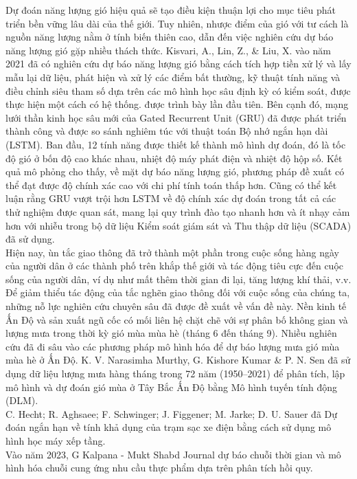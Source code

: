 \documentclass[conference]{IEEEtran}
\begin{document}
Dự đoán năng lượng gió hiệu quả sẽ tạo điều kiện thuận lợi cho mục tiêu phát triển bền vững lâu dài của thế giới. Tuy nhiên, nhược điểm của gió với tư cách là nguồn năng lượng nằm ở tính biến thiên cao, dẫn đến việc nghiên cứu dự báo năng lượng gió gặp nhiều thách thức. Kisvari, A., Lin, Z., & Liu, X. vào năm 2021 đã có nghiên cứu \cite{b4} dự báo năng lượng gió bằng cách tích hợp tiền xử lý và lấy mẫu lại dữ liệu, phát hiện và xử lý các điểm bất thường, kỹ thuật tính năng và điều chỉnh siêu tham số dựa trên các mô hình học sâu định kỳ có kiểm soát, được thực hiện một cách có hệ thống. được trình bày lần đầu tiên. Bên cạnh đó, mạng lưới thần kinh học sâu mới của Gated Recurrent Unit (GRU) đã được phát triển thành công và được so sánh nghiêm túc với thuật toán Bộ nhớ ngắn hạn dài (LSTM). Ban đầu, 12 tính năng được thiết kế thành mô hình dự đoán, đó là tốc độ gió ở bốn độ cao khác nhau, nhiệt độ máy phát điện và nhiệt độ hộp số. Kết quả mô phỏng cho thấy, về mặt dự báo năng lượng gió, phương pháp đề xuất có thể đạt được độ chính xác cao với chi phí tính toán thấp hơn. Cũng có thể kết luận rằng GRU vượt trội hơn LSTM về độ chính xác dự đoán trong tất cả các thử nghiệm được quan sát, mang lại quy trình đào tạo nhanh hơn và ít nhạy cảm hơn với nhiễu trong bộ dữ liệu Kiểm soát giám sát và Thu thập dữ liệu (SCADA) đã sử dụng.\\
Hiện nay, ùn tắc giao thông đã trở thành một phần trong cuộc sống hàng ngày của người dân ở các thành phố trên khắp thế giới và tác động tiêu cực đến cuộc sống của người dân, ví dụ như mất thêm thời gian đi lại, tăng lượng khí thải, v.v. Để giảm thiểu tác động của tắc nghẽn giao thông đối với cuộc sống của chúng ta, những nỗ lực nghiên cứu chuyên sâu đã được đề xuất về vấn đề này.\cite{b5}
Nền kinh tế Ấn Độ và sản xuất ngũ cốc có mối liên hệ chặt chẽ với sự phân bố không gian và lượng mưa trong thời kỳ gió mùa mùa hè (tháng 6 đến tháng 9). Nhiều nghiên cứu đã đi sâu vào các phương pháp mô hình hóa để dự báo lượng mưa gió mùa mùa hè ở Ấn Độ. K. V. Narasimha Murthy, G. Kishore Kumar & P. N. Sen đã sử dụng dữ liệu lượng mưa hàng tháng trong 72 năm (1950–2021) để phân tích, lập mô hình và dự đoán gió mùa ở Tây Bắc Ấn Độ bằng Mô hình tuyến tính động (DLM).\cite{b6}\\
C. Hecht; R. Aghsaee; F. Schwinger; J. Figgener; M. Jarke; D. U. Sauer đã Dự đoán ngắn hạn về tính khả dụng của trạm sạc xe điện bằng cách sử dụng mô hình học máy xếp tầng. \cite{b7}\\
Vào năm 2023, G Kalpana - Mukt Shabd Journal dự báo chuỗi thời gian và mô hình hóa chuỗi cung ứng nhu cầu thực phẩm dựa trên phân tích hồi quy.\cite{b8} \\
\end{document}
